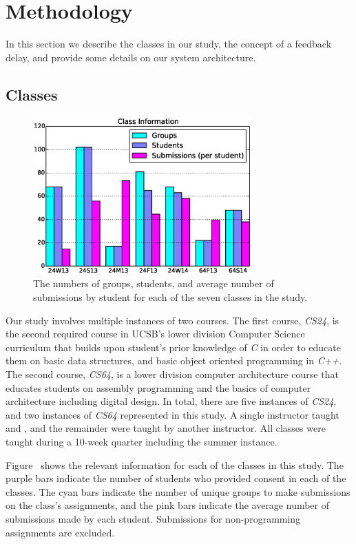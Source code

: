 \section{Methodology} 

In this section we describe the classes in our study, the concept of a feedback
delay, and provide some details on our system architecture.

\subsection{Classes}

\begin{figure}[!t]
\centering \includegraphics[width=3.3in]{graphs/Class_Information.eps}
\caption{The numbers of groups, students, and average number of submissions by
  student for each of the seven classes in the study.}
\end{figure}

Our study involves multiple instances of two courses. The first course,
\emph{CS24}, is the second required course in UCSB's lower division Computer
Science curriculum that builds upon student's prior knowledge of \emph{C} in
order to educate them on basic data structures, and basic object oriented
programming in \emph{C++}. The second course, \emph{CS64}, is a lower division
computer architecture course that educates students on assembly programming and
the basics of computer architecture including digital design. In total, there
are five instances of \emph{CS24}, and two instances of \emph{CS64} represented
in this study. A single instructor taught  and , and the
remainder were taught by another instructor. All classes were taught during a
10-week quarter including the summer instance.

Figure~ shows the relevant information for each of the
classes in this study. The purple bars indicate the number of students who
provided consent in each of the classes. The cyan bars indicate the number of
unique groups to make submissions on the class's assignments, and the pink bars
indicate the average number of submissions made by each student. Submissions
for non-programming assignments are excluded.

